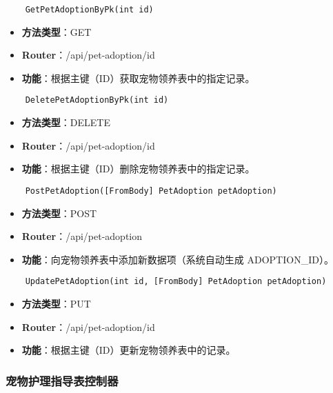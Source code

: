 \begin{verbatim}
	GetPetAdoptionByPk(int id)
\end{verbatim}

\begin{itemize}
	\item \textbf{方法类型}：GET
	\item \textbf{Router}：/api/pet-adoption/{id}
	\item \textbf{功能}：根据主键（ID）获取宠物领养表中的指定记录。
\end{itemize}

\begin{verbatim}
	DeletePetAdoptionByPk(int id)
\end{verbatim}

\begin{itemize}
	\item \textbf{方法类型}：DELETE
	\item \textbf{Router}：/api/pet-adoption/{id}
	\item \textbf{功能}：根据主键（ID）删除宠物领养表中的指定记录。
\end{itemize}

\begin{verbatim}
	PostPetAdoption([FromBody] PetAdoption petAdoption)
\end{verbatim}

\begin{itemize}
	\item \textbf{方法类型}：POST
	\item \textbf{Router}：/api/pet-adoption
	\item \textbf{功能}：向宠物领养表中添加新数据项（系统自动生成 ADOPTION\_ID）。
\end{itemize}

\begin{verbatim}
	UpdatePetAdoption(int id, [FromBody] PetAdoption petAdoption)
\end{verbatim}

\begin{itemize}
	\item \textbf{方法类型}：PUT
	\item \textbf{Router}：/api/pet-adoption/{id}
	\item \textbf{功能}：根据主键（ID）更新宠物领养表中的记录。
\end{itemize}

\subsubsection{宠物护理指导表控制器}

